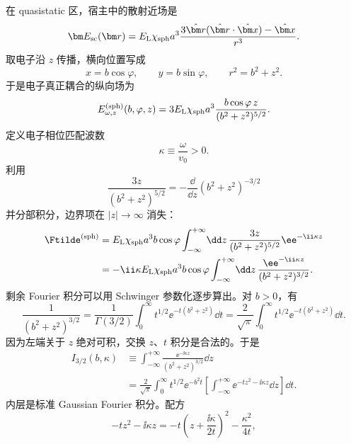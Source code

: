 在 quasistatic 区，宿主中的散射近场是
\begin{equation}
\bm E_{\rm sc}(\bm r)
=E_{\rm L}\chi_{\rm sph}a^3
\frac{3\hat{\bm r}(\hat{\bm r}\cdot\hat{\bm x})-\hat{\bm x}}{r^3}.
\label{eq:sphere-quasistatic-field}
\end{equation}
取电子沿 $z$ 传播，横向位置写成
\begin{equation}
x=b\cos\varphi,
\qquad
y=b\sin\varphi,
\qquad r^2=b^2+z^2.
\end{equation}
于是电子真正耦合的纵向场为
\begin{equation}
E_{\omega,z}^{(\rm sph)}(b,\varphi,z)
=3E_{\rm L}\chi_{\rm sph}a^3
\frac{b\cos\varphi\,z}{(b^2+z^2)^{5/2}}.
\label{eq:Ez-sphere-general}
\end{equation}
定义电子相位匹配波数
\begin{equation}
\kappa\equiv\frac{\omega}{v_0}>0.
\label{eq:kappa-electron}
\end{equation}
利用
\begin{equation}
\frac{3z}{(b^2+z^2)^{5/2}}
=-\frac{\dd}{\dd z}(b^2+z^2)^{-3/2}
\end{equation}
并分部积分，边界项在 $|z|\to\infty$ 消失：
\begin{align}
\Ftilde^{(\rm sph)}
&=E_{\rm L}\chi_{\rm sph}a^3b\cos\varphi
\int_{-\infty}^{+\infty}\!\dd z\,
\frac{3z}{(b^2+z^2)^{5/2}}\ee^{-\ii\kappa z}\\
&=-\ii\kappa E_{\rm L}\chi_{\rm sph}a^3b\cos\varphi
\int_{-\infty}^{+\infty}\!\dd z\,
\frac{\ee^{-\ii\kappa z}}{(b^2+z^2)^{3/2}}.
\end{align}
剩余 Fourier 积分可以用 Schwinger 参数化逐步算出。对 $b>0$，有
\begin{equation}
\frac{1}{(b^2+z^2)^{3/2}}
=\frac{1}{\Gamma(3/2)}
\int_0^{\infty} t^{1/2}\ee^{-t(b^2+z^2)}\dd t
=\frac{2}{\sqrt\pi}
\int_0^{\infty} t^{1/2}\ee^{-t(b^2+z^2)}\dd t.
\label{eq:schwinger-three-halves}
\end{equation}
因为左端关于 $z$ 绝对可积，交换 $z$、$t$ 积分是合法的。于是
\begin{align}
I_{3/2}(b,\kappa)
&\equiv
\int_{-\infty}^{+\infty}
\frac{\ee^{-\ii\kappa z}}{(b^2+z^2)^{3/2}}\dd z\\
&=\frac{2}{\sqrt\pi}
\int_0^{\infty}t^{1/2}\ee^{-b^2t}
\left[
\int_{-\infty}^{+\infty}
\ee^{-tz^2-\ii\kappa z}\dd z
\right]\dd t.
\end{align}
内层是标准 Gaussian Fourier 积分。配方
\begin{equation}
-tz^2-\ii\kappa z
=-t\left(z+\frac{\ii\kappa}{2t}\right)^2
-\frac{\kappa^2}{4t},
\end{equation}
